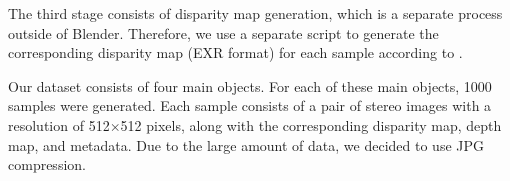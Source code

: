 The third stage consists of disparity map generation, which is a separate process outside of Blender. Therefore, we use a separate script to generate the corresponding disparity map (EXR format) for each sample according to .

Our dataset consists of four main objects. For each of these main objects, 1000 samples were generated. Each sample consists of a pair of stereo images with a resolution of 512$\times$512 pixels, along with the corresponding disparity map, depth map, and metadata. Due to the large amount of data, we decided to use JPG compression.


